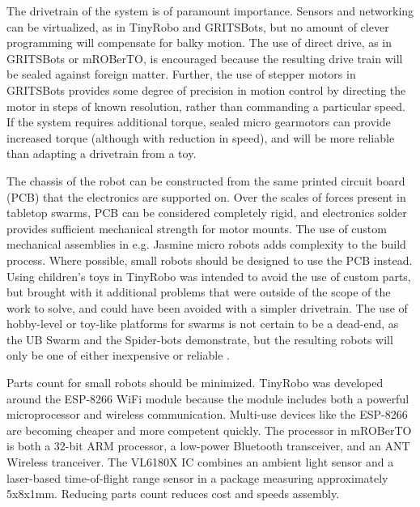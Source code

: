 The drivetrain of the system is of paramount importance. 
Sensors and networking can be virtualized, as in TinyRobo and GRITSBots, but no amount of clever programming will compensate for balky motion. 
The use of direct drive, as in GRITSBots or mROBerTO, is encouraged because the resulting drive train will be sealed against foreign matter. 
Further, the use of stepper motors in GRITSBots provides some degree of precision in motion control by directing the motor in steps of known resolution, rather than commanding a particular speed. 
If the system requires additional torque, sealed micro gearmotors can provide increased torque (although with reduction in speed), and will be more reliable than adapting a drivetrain from a toy. 

The chassis of the robot can be constructed from the same printed circuit board (PCB) that the electronics are supported on. 
Over the scales of forces present in tabletop swarms, PCB can be considered completely rigid, and electronics solder provides sufficient mechanical strength for motor mounts. 
The use of custom mechanical assemblies in e.g. Jasmine micro robots adds complexity to the build process. 
Where possible, small robots should be designed to use the PCB instead. 
Using children's toys in TinyRobo was intended to avoid the use of custom parts, but brought with it additional problems that were outside of the scope of the work to solve, and could have been avoided with a simpler drivetrain. 
The use of hobby-level or toy-like platforms for swarms is not certain to be a dead-end, as the UB Swarm and the Spider-bots demonstrate, but the resulting robots will only be one of either inexpensive or reliable \citep{patil2016ub, price2014spider}. 

Parts count for small robots should be minimized.
TinyRobo was developed around the ESP-8266 WiFi module because the module includes both a powerful microprocessor and wireless communication. 
Multi-use devices like the ESP-8266 are becoming cheaper and more competent quickly.
The processor in mROBerTO is both a 32-bit ARM processor, a low-power Bluetooth transceiver, and an ANT Wireless tranceiver. 
The VL6180X IC combines an ambient light sensor and a laser-based time-of-flight range sensor in a package measuring approximately 5x8x1mm. 
Reducing parts count reduces cost and speeds assembly. 

